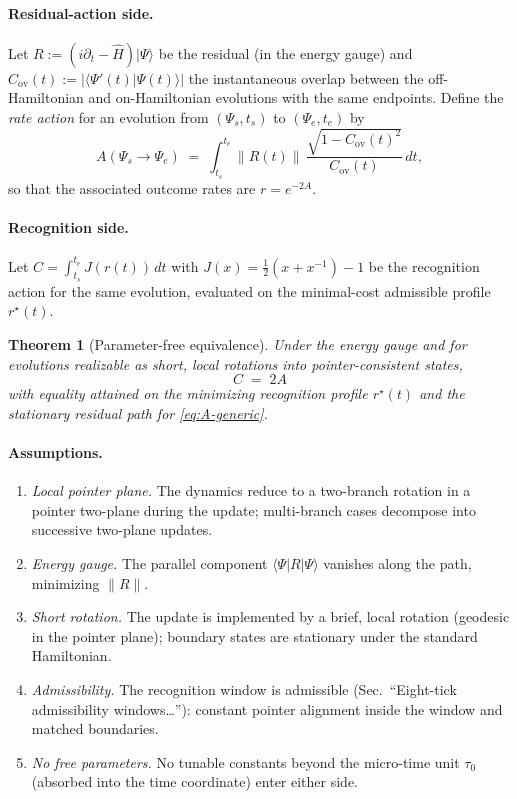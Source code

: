 \documentclass[11pt,letterpaper]{article}
\newtheorem{theorem}{Theorem}[section]
\theoremstyle{definition}
\begin{document}
\paragraph{Residual-action side.}
Let \(R:=(i\partial_t-\hat H)\lvert\Psi\rangle\) be the residual (in the energy gauge) and \(C_{\mathrm{ov}}(t):=|\langle \Psi'(t)\vert\Psi(t)\rangle|\) the instantaneous overlap between the off-Hamiltonian and on-Hamiltonian evolutions with the same endpoints. Define the \emph{rate action} for an evolution from \((\Psi_s,t_s)\) to \((\Psi_e,t_e)\) by
\begin{equation}
A(\Psi_s\!\to\!\Psi_e)\;=\;\int_{t_s}^{t_e}\!\! \|R(t)\|\,\frac{\sqrt{1-C_{\mathrm{ov}}(t)^2}}{C_{\mathrm{ov}}(t)}\,dt,
\label{eq:A-generic}
\end{equation}
so that the associated outcome rates are \(r=e^{-2A}\).

\paragraph{Recognition side.}
Let \(C=\int_{t_s}^{t_e}J(r(t))\,dt\) with \(J(x)=\frac12(x+x^{-1})-1\) be the recognition action for the same evolution, evaluated on the minimal-cost admissible profile \(r^\star(t)\).

\begin{theorem}[Parameter-free equivalence]
Under the energy gauge and for evolutions realizable as \emph{short, local rotations} into pointer-consistent states,
\begin{equation}
\boxed{\quad C\;=\;2A \quad}
\label{eq:equivalence}
\end{equation}
with equality attained on the minimizing recognition profile \(r^\star(t)\) and the stationary residual path for \eqref{eq:A-generic}.
\end{theorem}

\paragraph{Assumptions.}
\begin{enumerate}
\item \emph{Local pointer plane.} The dynamics reduce to a two-branch rotation in a pointer two-plane during the update; multi-branch cases decompose into successive two-plane updates.
\item \emph{Energy gauge.} The parallel component \(\langle\Psi|R|\Psi\rangle\) vanishes along the path, minimizing \(\|R\|\).
\item \emph{Short rotation.} The update is implemented by a brief, local rotation (geodesic in the pointer plane); boundary states are stationary under the standard Hamiltonian.
\item \emph{Admissibility.} The recognition window is admissible (Sec.~``Eight-tick admissibility windows\ldots''): constant pointer alignment inside the window and matched boundaries.
\item \emph{No free parameters.} No tunable constants beyond the micro-time unit \(\tau_0\) (absorbed into the time coordinate) enter either side.
\end{enumerate}
\end{document}
